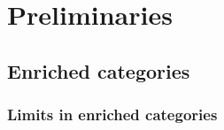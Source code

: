 \documentclass[../thesis.tex]{subfiles}
\begin{document}
  \chapter{Preliminaries}


  \section{Enriched categories}
  \label{sec:enriched}

  \subsection{Limits in enriched categories}
  \label{sec:enriched/limits}
\end{document}
